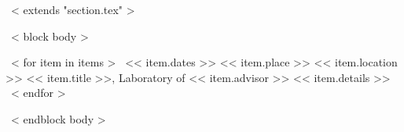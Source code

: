 ~< extends "section.tex" >~

~< block body >~
\begin{entrylistFive}
~< for item in items >~
\entryFive
{<< item.dates >>}
{<< item.place >>}
{<< item.location >>}
{<< item.title >>, Laboratory of << item.advisor >>}
{<< item.details >>}
~< endfor >~
\end{entrylistFive}
~< endblock body >~
